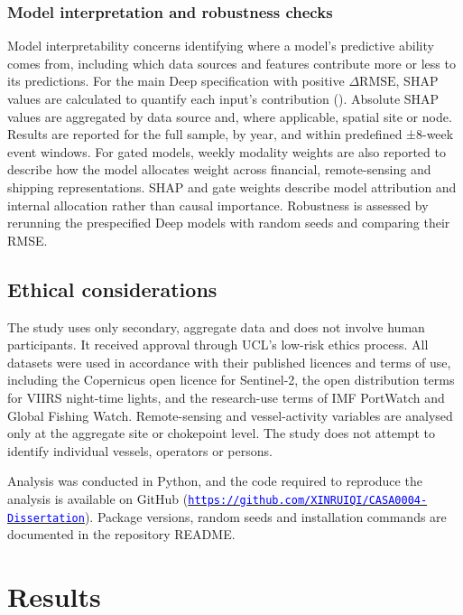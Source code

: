 \documentclass[
  british,
  12pt,
  oneside]{book}
\begin{document}
\subsection{Model interpretation and robustness checks}\label{method-interp}

Model interpretability concerns identifying where a model's predictive ability comes from, including which data sources and features contribute more or less to its predictions. For the main Deep specification with positive \(\Delta\mathrm{RMSE}\), SHAP values are calculated to quantify each input's contribution (). Absolute SHAP values are aggregated by data source and, where applicable, spatial site or node. Results are reported for the full sample, by year, and within predefined ±8-week event windows. For gated models, weekly modality weights are also reported to describe how the model allocates weight across financial, remote-sensing and shipping representations. SHAP and gate weights describe model attribution and internal allocation rather than causal importance. Robustness is assessed by rerunning the prespecified Deep models with random seeds and comparing their RMSE.

\section{Ethical considerations}\label{method-ethics}

The study uses only secondary, aggregate data and does not involve human participants. It received approval through UCL's low-risk ethics process. All datasets were used in accordance with their published licences and terms of use, including the Copernicus open licence for Sentinel-2, the open distribution terms for VIIRS night-time lights, and the research-use terms of IMF PortWatch and Global Fishing Watch. Remote-sensing and vessel-activity variables are analysed only at the aggregate site or chokepoint level. The study does not attempt to identify individual vessels, operators or persons.

Analysis was conducted in Python, and the code required to reproduce the analysis is available on GitHub (\href{https://github.com/XINRUIQI/CASA0004-Dissertation}{\textcolor{blue}{\nolinkurl{https://github.com/XINRUIQI/CASA0004-Dissertation}}}). Package versions, random seeds and installation commands are documented in the repository README.

\chapter{Results}\label{results}
\end{document}
